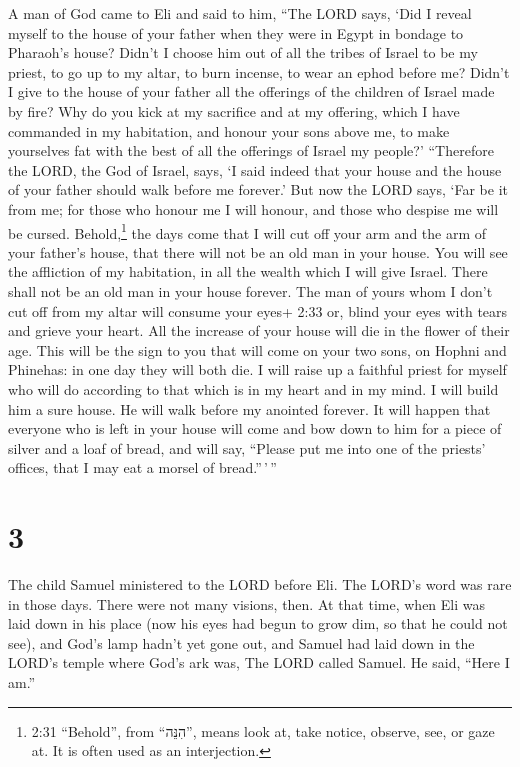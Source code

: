  A man of God came to Eli and said to him, ``The LORD says,
`Did I reveal myself to the house of your father when they were in Egypt
in bondage to Pharaoh's house?  Didn't I choose him out of
all the tribes of Israel to be my priest, to go up to my altar, to burn
incense, to wear an ephod before me? Didn't I give to the house of your
father all the offerings of the children of Israel made by fire?
 Why do you kick at my sacrifice and at my offering, which
I have commanded in my habitation, and honour your sons above me, to
make yourselves fat with the best of all the offerings of Israel my
people?'  ``Therefore the LORD, the God of Israel, says, `I
said indeed that your house and the house of your father should walk
before me forever.' But now the LORD says, `Far be it from me; for those
who honour me I will honour, and those who despise me will be cursed.
 Behold,\footnote{2:31 ``Behold'', from ``הִנֵּה'', means
  look at, take notice, observe, see, or gaze at. It is often used as an
  interjection.} the days come that I will cut off your arm and the arm
of your father's house, that there will not be an old man in your house.
 You will see the affliction of my habitation, in all the
wealth which I will give Israel. There shall not be an old man in your
house forever.  The man of yours whom I don't cut off from
my altar will consume your eyes+ 2:33 or, blind your eyes with tears and
grieve your heart. All the increase of your house will die in the flower
of their age.  This will be the sign to you that will come
on your two sons, on Hophni and Phinehas: in one day they will both die.
 I will raise up a faithful priest for myself who will do
according to that which is in my heart and in my mind. I will build him
a sure house. He will walk before my anointed forever.  It
will happen that everyone who is left in your house will come and bow
down to him for a piece of silver and a loaf of bread, and will say,
``Please put me into one of the priests' offices, that I may eat a
morsel of bread.''\,'\,''

\hypertarget{section-2}{%
\section{3}\label{section-2}}

 The child Samuel ministered to the LORD before Eli. The
LORD's word was rare in those days. There were not many visions, then.
 At that time, when Eli was laid down in his place (now his
eyes had begun to grow dim, so that he could not see),  and
God's lamp hadn't yet gone out, and Samuel had laid down in the LORD's
temple where God's ark was,  The LORD called Samuel. He
said, ``Here I am.''

